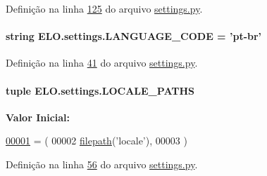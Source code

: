 Definição na linha \hyperlink{settings_8py_source_l00125}{125} do arquivo \hyperlink{settings_8py_source}{settings.\-py}.

\hypertarget{namespaceELO_1_1settings_a388841a63bae5418e55fb741f938d4fb}{
\paragraph[{L\-A\-N\-G\-U\-A\-G\-E\-\_\-\-C\-O\-D\-E}]{\setlength{\rightskip}{0pt plus 5cm}string E\-L\-O.\-settings.\-L\-A\-N\-G\-U\-A\-G\-E\-\_\-\-C\-O\-D\-E = 'pt-\/br'}}\label{namespaceELO_1_1settings_a388841a63bae5418e55fb741f938d4fb}


Definição na linha \hyperlink{settings_8py_source_l00041}{41} do arquivo \hyperlink{settings_8py_source}{settings.\-py}.

\hypertarget{namespaceELO_1_1settings_a977570dd2e9cd8142b3d65c4fa37c172}{
\paragraph[{L\-O\-C\-A\-L\-E\-\_\-\-P\-A\-T\-H\-S}]{\setlength{\rightskip}{0pt plus 5cm}tuple E\-L\-O.\-settings.\-L\-O\-C\-A\-L\-E\-\_\-\-P\-A\-T\-H\-S}}\label{namespaceELO_1_1settings_a977570dd2e9cd8142b3d65c4fa37c172}
{\bfseries Valor Inicial\-:}
\begin{DoxyCode}
\hypertarget{namespaceELO_1_1settings_l00001}{}\hyperlink{namespaceELO_1_1settings}{00001} = (
00002     \hyperlink{namespaceELO_1_1settings_a7730264ddd478343e0f282f36d4a5ab4}{filepath}(\textcolor{stringliteral}{'locale'}),
00003 )
\end{DoxyCode}


Definição na linha \hyperlink{settings_8py_source_l00056}{56} do arquivo \hyperlink{settings_8py_source}{settings.\-py}.

